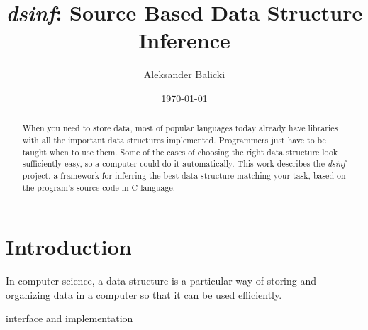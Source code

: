 \documentclass[11pt]{article}
\title{\emph{dsinf}: Source Based Data Structure Inference}
\author{Aleksander Balicki}
\date{\today}
\begin{document}
\maketitle

\begin{abstract}

	When you need to store data,  most of popular languages today already
	have libraries with all the important data structures implemented.  Programmers just have to be taught when to
	use them.  Some of the cases of choosing the right data structure look sufficiently easy, so a computer could do
	it automatically. This work describes the \emph{dsinf} project, a framework for inferring the best data
	structure matching your task, based on the program's source code in C language. 

\end{abstract}

\pagebreak

\tableofcontents

\vfill

\section{Introduction}
	In computer science, a data structure is a particular way of storing and organizing data in a computer so that
	it can be used efficiently.

	interface and implementation
\end{document}
